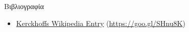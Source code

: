 \documentclass[handout]{beamer}
\begin{document}
\begin{frame}[allowframebreaks]{Βιβλιογραφία}
\begin{small}
\begin{itemize}
\item \href{https://goo.gl/SHnu8K}{Kerckhoffs Wikipedia Entry} (\url{https://goo.gl/SHnu8K})



\end{itemize}
\end{small}
\end{frame}

 
\end{document}
